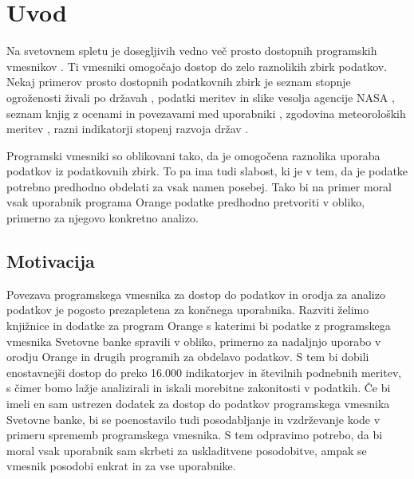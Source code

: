 
\chapter{Uvod}

Na svetovnem spletu je dosegljivih vedno več prosto dostopnih programskih
vmesnikov . 
Ti vmesniki omogočajo dostop
do zelo raznolikih zbirk podatkov. Nekaj primerov prosto dostopnih podatkovnih
zbirk je seznam stopnje ogroženosti živali po državah 
    ,
podatki meritev in slike vesolja agencije NASA
    ,
seznam knjig z ocenami in povezavami med uporabniki 
    ,
zgodovina meteoroloških meritev 
    ,
razni indikatorji stopenj razvoja držav
    .

Programski vmesniki so oblikovani tako, da je omogočena raznolika uporaba
podatkov iz podatkovnih zbirk. To pa ima tudi slabost, ki je v tem, da je 
podatke potrebno predhodno obdelati za vsak namen posebej. Tako bi na primer 
moral vsak uporabnik programa Orange podatke predhodno pretvoriti v obliko, 
primerno za njegovo konkretno analizo.


\section{Motivacija}


Povezava programskega vmesnika za dostop do podatkov in orodja za analizo 
podatkov je pogosto prezapletena za končnega uporabnika. Razviti želimo
knjižnice in dodatke za program Orange s katerimi bi podatke z programskega
vmesnika Svetovne banke spravili v  obliko, primerno za nadaljnjo
uporabo v orodju Orange in drugih programih za obdelavo podatkov. S tem bi
dobili enostavnejši dostop do preko 16.000 indikatorjev in številnih podnebnih
meritev, s čimer bomo lažje analizirali in iskali morebitne zakonitosti v
podatkih. Če bi imeli en sam ustrezen dodatek za dostop do podatkov
programskega vmesnika Svetovne banke, bi se poenostavilo tudi posodabljanje in
vzdrževanje kode v primeru sprememb programskega vmesnika. S tem odpravimo
potrebo, da bi moral vsak uporabnik sam skrbeti za uskladitvene posodobitve,
ampak se vmesnik posodobi enkrat in za vse uporabnike.


